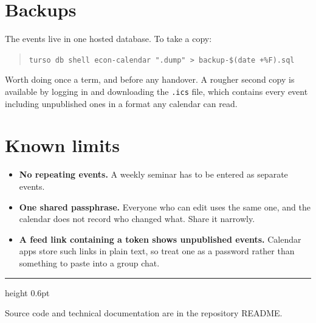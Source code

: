 \documentclass[11pt,a4paper]{article}
\newcommand{\code}[1]{\texttt{\small #1}}
\begin{document}
\section{Backups}

The events live in one hosted database. To take a copy:

\begin{quote}
\code{turso db shell econ-calendar ".dump" > backup-\$(date +\%F).sql}
\end{quote}

Worth doing once a term, and before any handover. A rougher second copy is
available by logging in and downloading the \code{.ics} file, which contains
every event including unpublished ones in a format any calendar can read.

\section{Known limits}

\begin{itemize}
  \item \textbf{No repeating events.} A weekly seminar has to be entered as
        separate events.
  \item \textbf{One shared passphrase.} Everyone who can edit uses the same one,
        and the calendar does not record who changed what. Share it narrowly.
  \item \textbf{A feed link containing a token shows unpublished events.} Calendar apps
        store such links in plain text, so treat one as a password rather than
        something to paste into a group chat.
\end{itemize}

\vspace{1.4em}
{\color{rule}\hrule height 0.6pt}
\vspace{0.5em}
{\footnotesize\color{muted} Source code and technical documentation are in the
repository README.}
\end{document}
